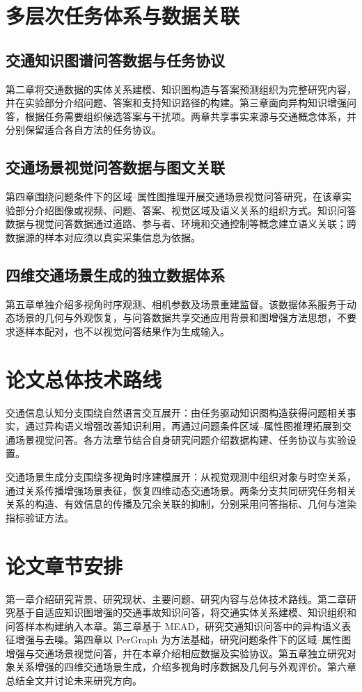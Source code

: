 \section{多层次任务体系与数据关联}

\subsection{交通知识图谱问答数据与任务协议}

第二章将交通数据的实体关系建模、知识图构造与答案预测组织为完整研究内容，并在实验部分介绍问题、答案和支持知识路径的构建。第三章面向异构知识增强问答，根据任务需要组织候选答案与干扰项。两章共享事实来源与交通概念体系，并分别保留适合各自方法的任务协议。

\subsection{交通场景视觉问答数据与图文关联}

第四章围绕问题条件下的区域--属性图推理开展交通场景视觉问答研究，在该章实验部分介绍图像或视频、问题、答案、视觉区域及语义关系的组织方式。知识问答数据与视觉问答数据通过道路、参与者、环境和交通控制等概念建立语义关联；跨数据源的样本对应须以真实采集信息为依据。

\subsection{四维交通场景生成的独立数据体系}

第五章单独介绍多视角时序观测、相机参数及场景重建监督。该数据体系服务于动态场景的几何与外观恢复，与问答数据共享交通应用背景和图增强方法思想，不要求逐样本配对，也不以视觉问答结果作为生成输入。

\section{论文总体技术路线}

交通信息认知分支围绕自然语言交互展开：由任务驱动知识图构造获得问题相关事实，通过异构语义增强改善知识利用，再通过问题条件区域--属性图推理拓展到交通场景视觉问答。各方法章节结合自身研究问题介绍数据构建、任务协议与实验设置。

交通场景生成分支围绕多视角时序建模展开：从视觉观测中组织对象与时空关系，通过关系传播增强场景表征，恢复四维动态交通场景。两条分支共同研究任务相关关系的构造、有效信息的传播及冗余关联的抑制，分别采用问答指标、几何与渲染指标验证方法。

\section{论文章节安排}

第一章介绍研究背景、研究现状、主要问题、研究内容与总体技术路线。第二章研究基于自适应知识图增强的交通事故知识问答，将交通实体关系建模、知识组织和问答样本构建纳入本章。第三章基于 MEAD，研究交通知识问答中的异构语义表征增强与去噪。第四章以 PerGraph 为方法基础，研究问题条件下的区域--属性图增强与交通场景视觉问答，并在本章介绍相应数据及实验协议。第五章独立研究对象关系增强的四维交通场景生成，介绍多视角时序数据及几何与外观评价。第六章总结全文并讨论未来研究方向。
